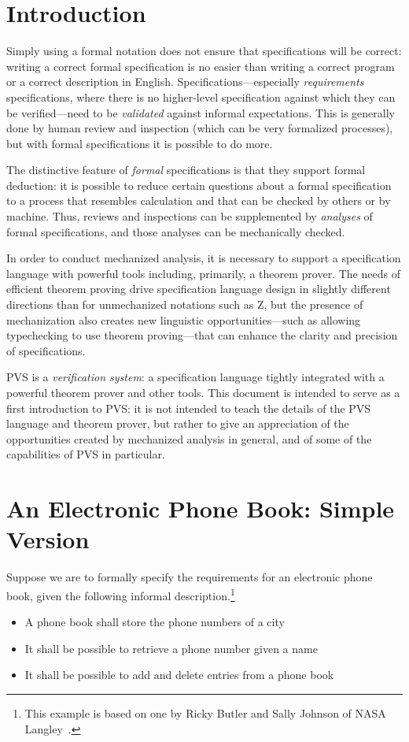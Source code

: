
\section{Introduction}

Simply using a formal notation does not ensure that specifications
will be correct: writing a correct formal specification is no easier
than writing a correct program or a correct description in English.
Specifications---especially {\em requirements} specifications, where
there is no higher-level specification against which they can be
verified---need to be {\em validated\/} against informal
expectations.   This is generally done by human review and inspection
(which can be very formalized processes), but with formal
specifications it is possible to do more.

The distinctive feature of {\em formal\/} specifications is that they
support formal deduction: it is possible to reduce certain questions
about a formal specification to a process that resembles calculation
and that can be checked by others or by machine.
Thus, reviews and inspections can be supplemented by {\em analyses\/}
of formal specifications, and those analyses can be mechanically checked.

In order to conduct mechanized analysis, it is necessary to support a
specification language with powerful tools including, primarily, a
theorem prover.  The needs of efficient theorem proving drive
specification language design in slightly different directions than
for unmechanized notations such as Z, but the presence of
mechanization also creates new linguistic opportunities---such as allowing
typechecking to use theorem proving---that can enhance the clarity and
precision of specifications.

PVS is a {\em verification system\/}: a specification language
tightly integrated with a powerful theorem prover and other tools.
This document is intended to serve as a first introduction to PVS: it
is not intended to teach the details of the PVS language and theorem
prover, but rather to give an appreciation of the opportunities
created by mechanized analysis in general, and of some of the
capabilities of PVS in particular.

\section{An Electronic Phone Book: Simple Version}

Suppose we are to formally specify the requirements for an electronic phone
book, given the following informal description.\footnote{This example
is based on one by Ricky Butler and Sally Johnson of NASA
Langley~\cite{Butler&Johnson93}.}
\begin{itemize}
\item A phone book shall store the phone numbers of a city
\item It shall be possible to retrieve a phone number given a name
\item It shall be possible to add and delete entries from a phone book
\end{itemize}

